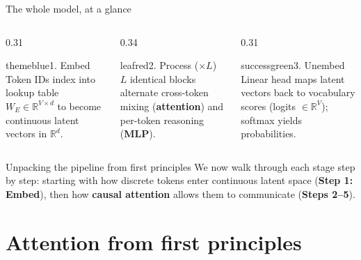 \documentclass[handout]{beamer}
\begin{document}
\begin{frame}{The whole model, at a glance}
  \vspace{-2pt}
  \begin{columns}[T]
    \begin{column}{0.31\linewidth}
      \begin{coursebox}{themeblue}{1. Embed}
        \scriptsize
        Token IDs index into lookup table $W_E \in \mathbb{R}^{V \times d}$ to become continuous latent vectors in $\mathbb{R}^d$.
      \end{coursebox}
    \end{column}
    \begin{column}{0.34\linewidth}
      \begin{coursebox}{leafred}{2. Process ($\times L$)}
        \scriptsize
        $L$ identical blocks alternate cross-token mixing (\textbf{attention}) and per-token reasoning (\textbf{MLP}).
      \end{coursebox}
    \end{column}
    \begin{column}{0.31\linewidth}
      \begin{coursebox}{successgreen}{3. Unembed}
        \scriptsize
        Linear head maps latent vectors back to vocabulary scores (logits $\in \mathbb{R}^V$); softmax yields probabilities.
      \end{coursebox}
    \end{column}
  \end{columns}

  \begin{block}{Unpacking the pipeline from first principles}
    \scriptsize
    We now walk through each stage step by step: starting with how discrete tokens enter continuous latent space (\textbf{Step 1: Embed}), then how \textbf{causal attention} allows them to communicate (\textbf{Steps 2--5}).
  \end{block}
\end{frame}

\section{Attention from first principles}
\end{document}
